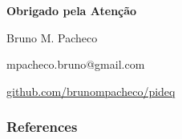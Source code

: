 \documentclass[t]{beamer}
\begin{document}
{
\begin{frame}
\vspace{15mm}
\begin{center}
\textcolor{cinza}{
\textbf{Obrigado pela Atenção}
}
\end{center}
\vspace{-6mm}
\begin{center}
\textcolor{cinza}{\scriptsize{
	Bruno M. Pacheco
}}
\end{center}
\vspace{-6mm}
\begin{center}
\textcolor{cinza}{\scriptsize{
mpacheco.bruno@gmail.com
}}
\end{center}
\vspace{-6mm}
\begin{center}
\textcolor{cinza}{\scriptsize{
\href{https://github.com/brunompacheco/pideq}{github.com/brunompacheco/pideq}
}}
\end{center}
\end{frame}
}

\begin{frame}
    \frametitle{References}
    \printbibliography
\end{frame}
\end{document}
